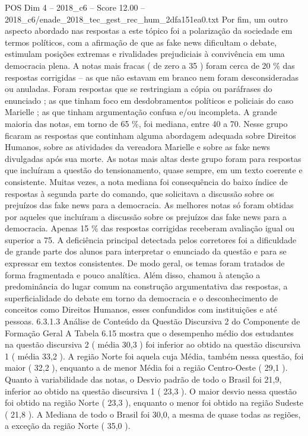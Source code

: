\begin{textsample}{POS Dim 4 – 2018\_c6 – Score 12.00 – 2018\_c6/enade\_2018\_tec\_gest\_rec\_hum\_2dfa151ea0.txt}
Por fim, um outro aspecto abordado nas respostas a este tópico foi a polarização da sociedade em termos políticos, com a afirmação de que as fake news dificultam o debate, estimulam posições extremas e rivalidades prejudiciais à convivência em uma democracia plena.
A notas mais fracas ( de zero a 35 ) foram cerca de 20 \% das respostas corrigidas – as que não estavam em branco nem foram desconsideradas ou anuladas.
Foram respostas que se restringiam a cópia ou paráfrases do enunciado ; as que tinham foco em desdobramentos políticos e policiais do caso Marielle ; as que tinham argumentação confusa e/ou incompleta.
A grande maioria das notas, em torno de 65 \%, foi mediana, entre 40 a 70.
Nesse grupo ficaram as respostas que continham alguma abordagem adequada sobre Direitos Humanos, sobre as atividades da vereadora Marielle e sobre as fake news divulgadas após sua morte.
As notas mais altas deste grupo foram para respostas que incluíram a questão do tensionamento, quase sempre, em um texto coerente e consistente.
Muitas vezes, a nota mediana foi consequência do baixo índice de respostas à segunda parte do comando, que solicitava a discussão sobre os prejuízos das fake news para a democracia.
As melhores notas só foram obtidas por aqueles que incluíram a discussão sobre os prejuízos das fake news para a democracia.
Apenas 15 \% das respostas corrigidas receberam avaliação igual ou superior a 75.
A deficiência principal detectada pelos corretores foi a dificuldade de grande parte dos alunos para interpretar o enunciado da questão e para se expressar em textos consistentes.
De modo geral, os temas foram tratados de forma fragmentada e pouco analítica.
Além disso, chamou à atenção a predominância do lugar comum na construção argumentativa das respostas, a superficialidade do debate em torno da democracia e o desconhecimento de conceitos como Direitos Humanos, esses confundidos com instituições e até pessoas. 6.3.1.3 Análise de Conteúdo da Questão Discursiva 2 do Componente de Formação Geral A Tabela 6.15 mostra que o desempenho médio dos estudantes na questão discursiva 2 ( média 30,3 ) foi inferior ao obtido na questão discursiva 1 ( média 33,2 ).
A região Norte foi aquela cuja Média, também nessa questão, foi maior ( 32,2 ), enquanto a de menor Média foi a região Centro-Oeste ( 29,1 ).
Quanto à variabilidade das notas, o Desvio padrão de todo o Brasil foi 21,9, inferior ao obtido na questão discursiva 1 ( 23,3 ).
O maior desvio nessa questão foi obtido na região Norte ( 23,3 ), enquanto o menor foi obtido na região Sudeste ( 21,8 ).
A Mediana de todo o Brasil foi 30,0, a mesma de quase todas as regiões, a exceção da região Norte ( 35,0 ).

\end{textsample}
